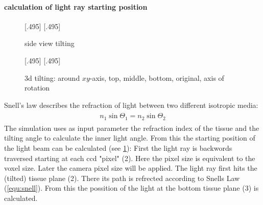 \paragraph{calculation of light ray starting position}
% 
\begin{figure}[!t]
\def\tikzwidth{0.42\textwidth}
% 
[.495\textwidth]{
\def\tilt{0}
\def\nindex{2.25}
}
% 
[.495\textwidth]{
\def\tilt{20}
\def\nindex{2.25}
}
\caption{side view tilting}
\label{fig:tilted_side_view}
\end{figure}
% 
\begin{figure}[!t]
% 
\def\tikzheight{0.42\textwidth}
\def\azimuth{0}
\def\elevation{90}
\def\dz{2}
[.495\textwidth]{
}
% 
\def\azimuth{20}
\def\elevation{25}
\def\dz{1}
[.495\textwidth]{
}
% 
\tikzexternaldisable
\caption[3d tilting]{3d tilting: around $xy$-axis, \raisebox{.25em}{\tikz \draw[red,thick](0,0)--(0.25,0);} top, \raisebox{.25em}{\tikz \draw[green!50!black,thick](0,0)--(0.25,0);} middle, \raisebox{.25em}{\tikz \draw[blue,thick](0,0)--(0.25,0);} bottom, \raisebox{.25em}{\tikz \draw[dash pattern=on 1.25pt off 1.25pt,thick](0,0)--(0.25,0);} original, \raisebox{.25em}{\tikz \draw[gray](0,0)--(0.25,0);} axis of rotation }
\tikzexternalenable
\end{figure}
% 
Snell's law describes the refraction of light between two different isotropic media:
\begin{align}
\begin{split}
    n_1 \sin{\Theta_1} = n_2 \sin{\Theta_2}
\end{split}
\label{equ:snell}
\end{align}
% 
The simulation uses as input parameter the refraction index of the tissue and the tilting angle to calculate the inner light angle.
From this the starting position of the light beam can be calculated (see \cref{fig:tilted_side_view}):
% 
First the light ray is backwords traversed starting at each ccd "pixel" (2).
Here the pixel size is equivalent to the voxel size.
Later the camera pixel size will be applied.
The light ray first hits the (tilted) tissue plane (2).
There its path is refrected according to Snells Law (\cref{equ:snell}).
From this the possition of the light at the bottom tissue plane (3) is calculated.
